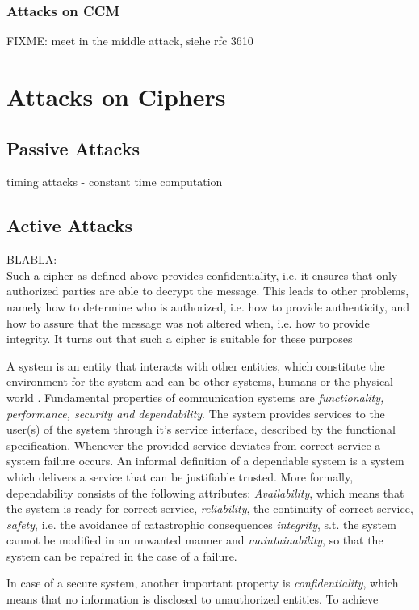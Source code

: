 \subsubsection{Attacks on CCM}

FIXME: meet in the middle attack, siehe rfc 3610



\section{Attacks on Ciphers}

\subsection{Passive Attacks}

timing attacks - constant time computation

\subsection{Active Attacks}


BLABLA:
\\

Such a cipher as defined above provides confidentiality, i.e. it ensures that only authorized parties are able to decrypt the message. This leads to other
problems, namely how to determine who is authorized, i.e. how to provide authenticity, and how to assure that the message was not altered when, i.e. how to 
provide integrity. It turns out that such a cipher is suitable for these purposes

A system is an entity that interacts with other entities, which constitute the environment for the system and
can be other systems, humans or the physical world \cite{1335465}. Fundamental properties of communication systems
are \textit{functionality, performance, security and dependability}. The system provides services to the user(s) 
of the system through it's service interface, described by the functional specification. Whenever the provided service
deviates from correct service a system failure occurs. 
An informal definition of a dependable system is a system which delivers a service that can be justifiable trusted. More formally,
dependability consists of the following attributes:
\textit{Availability}, which means that the system is ready for correct service, \textit{reliability}, the continuity of correct service,
\textit{safety}, i.e. the avoidance of catastrophic consequences \textit{integrity}, s.t. the system cannot be modified in an unwanted manner
and \textit{maintainability}, so that the system can be repaired in the case of a failure.

In case of a secure system, another important property is \textit{confidentiality}, which means that no information is disclosed to unauthorized 
entities.
To achieve 
